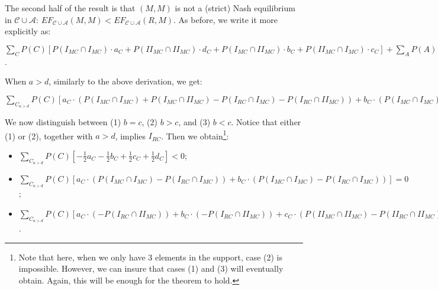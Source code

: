 \documentclass[fleqn,reqno,11pt]{article}
\begin{document}
\medskip{}

The second half of the result is that $(M,M)$ is not a (strict) Nash equilibrium in $\mathcal{C}\cup\mathcal{A}$: $EF_{\mathcal{C}\cup\mathcal{A}}(M,M)<EF_{\mathcal{C}\cup\mathcal{A}}(R,M)$.
As before, we write it more explicitly as:

\medskip{}


\noindent $\sum_{C}P(C)[P(I_{MC}\cap I_{MC})\cdot a_{C}+P(II_{MC}\cap II_{MC})\cdot d_{C}+P(I_{MC}\cap II_{MC})\cdot b_{C}+P(II_{MC}\cap I_{MC})\cdot c_{C}]+\sum_{A}P(A)[P(I_{MA}\cap I_{MA})\cdot a_{A}+P(II_{MA}\cap II_{MA})\cdot d_{A}+P(I_{MA}\cap II_{MA})\cdot b_{A}+P(II_{MA}\cap I_{MA})\cdot c_{A}] < \sum_{C}P(C)[P(I_{RC}\cap I_{MC})\cdot a_{C}+P(II_{RC}\cap II_{MC})\cdot d_{C}+P(I_{RC}\cap II_{MC})\cdot b_{C}+P(II_{RC}\cap I_{MC})\cdot c_{C}]+\sum_{A}P(A)[P(I_{RA}\cap I_{MA})\cdot a_{A}+P(II_{RA}\cap II_{MA})\cdot d_{A}+P(I_{RA}\cap II_{MA})\cdot b_{A}+P(II_{RA}\cap I_{MA})\cdot c_{A}]$.
\medskip{}

\noindent When $a>d$, similarly to the above derivation, we get: 

\medskip{}
\noindent $\sum_{C_{a>d}} P(C)[a_{C} \cdot (P(I_{MC}\cap I_{MC}) + P(I_{MC}\cap II_{MC})- P(I_{RC}\cap I_{MC}) - P(I_{RC}\cap II_{MC})) + b_{C} \cdot  (P(I_{MC}\cap I_{MC}) + P(I_{MC}\cap II_{MC})- P(I_{RC}\cap I_{MC}) - P(I_{RC}\cap II_{MC})) + c_{C} \cdot (P(II_{MC}\cap I_{MC}) +P(II_{MC}\cap II_{MC})- P(II_{RC}\cap II_{MC})) + d_{C} \cdot (P(II_{MC}\cap II_{MC})+P(II_{MC}\cap I_{MC})- P(II_{RC}\cap II_{MC}))]< 0$
\medskip{}

\noindent We now distinguish between (1) $b=c$, (2) $b>c$, and (3) $b<c$. Notice that either (1) or (2), together with $a>d$, implies $I_{RC}$. Then we obtain\footnote{Note that here, when we only have 3 elements in the support, case (2) is impossible. However, we can insure that cases (1) and (3) will eventually obtain. Again, this will be enough for the theorem to hold.}:
\begin{itemize}

\item[(1)] $\sum_{C_{a>d}} P(C)[-\frac{1}{2}a_{C} - \frac{1}{2}b_{C} + \frac{1}{2}c_{C} + \frac{1}{2}d_{C}]< 0$;

\item[(2)] $\sum_{C_{a>d}} P(C)[a_{C} \cdot (P(I_{MC}\cap I_{MC}) - P(I_{RC}\cap I_{MC})) + b_{C} \cdot  (P(I_{MC}\cap I_{MC}) - P(I_{RC}\cap I_{MC}))]= 0$;

\item[(3)] $\sum_{C_{a>d}} P(C)[a_{C} \cdot (- P(I_{RC}\cap II_{MC})) + b_{C} \cdot  (- P(I_{RC}\cap II_{MC})) + c_{C} \cdot (P(II_{MC}\cap II_{MC})- P(II_{RC}\cap II_{MC})) + d_{C} \cdot (P(II_{MC}\cap II_{MC})- P(II_{RC}\cap II_{MC}))] \leq 0$.

\end{itemize}
\end{document}
